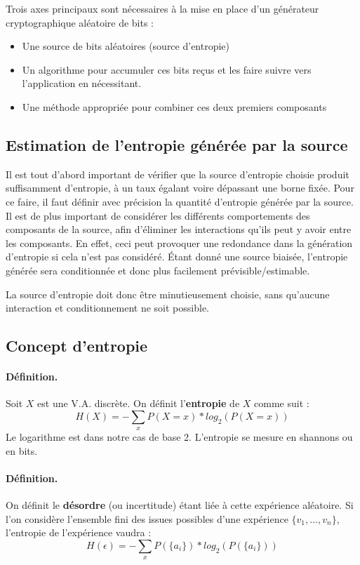 Trois axes principaux sont nécessaires à la mise en place d'un générateur cryptographique aléatoire de bits : 
\begin{itemize}
\item Une source de bits aléatoires (source d'entropie)
\item Un algorithme pour accumuler ces bits reçus et les faire suivre vers l'application en nécessitant.
\item Une méthode appropriée pour combiner ces deux premiers composants\\
\end{itemize}


\subsection{Estimation de l'entropie générée par la source}
Il est tout d'abord important de vérifier que la source d'entropie choisie produit suffisamment d'entropie, à un taux égalant voire dépassant une borne fixée. Pour ce faire, il faut définir avec précision la quantité d'entropie générée par la source. Il est de plus important de considérer les différents comportements des composants de la source, afin d'éliminer les interactions qu'ils peut y avoir entre les composants. En effet, ceci peut provoquer une redondance dans la génération d'entropie si cela n'est pas considéré. Étant donné une source biaisée, l'entropie générée sera conditionnée et donc plus facilement prévisible/estimable.

La source d'entropie doit donc être minutieusement choisie, sans qu'aucune interaction et conditionnement ne soit possible.

\subsection{Concept d'entropie}
\paragraph{Définition.\\}
Soit $X$ est une V.A. discrète. On définit l'\textbf{entropie} de $X$ comme suit : 
$$H(X) = - \sum_x P(X=x)*log_2(P(X=x))	 $$ 
Le logarithme est dans notre cas de base 2. L'entropie se mesure en shannons ou en bits.\\

\paragraph{Définition.\\}
On définit le \textbf{désordre} (ou incertitude) étant liée à cette expérience aléatoire. Si l'on considère l'ensemble fini des issues possibles d'une expérience $\lbrace v_1,...,v_n \rbrace$, l'entropie de l'expérience vaudra :
$$H(\epsilon) = - \sum_x P(\lbrace a_i \rbrace)*log_2(P(\lbrace a_i \rbrace))	 $$ 

